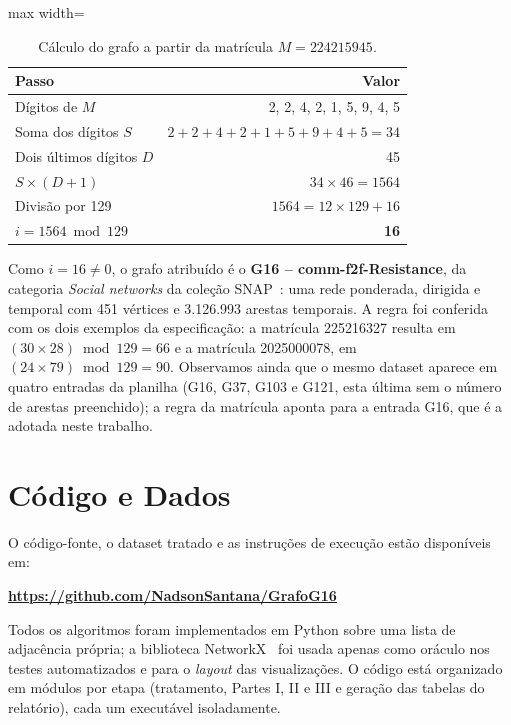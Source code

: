 \documentclass[sigconf]{webmedia}
\begin{document}
\begin{table}[h]
  \caption{Cálculo do grafo a partir da matrícula $M = 224215945$.}
  \label{tab:matricula}
  \begin{adjustbox}{max width=\columnwidth}
  \begin{tabular}{lr}
    \toprule
    Passo & Valor \\
    \midrule
    Dígitos de $M$ & 2, 2, 4, 2, 1, 5, 9, 4, 5 \\
    Soma dos dígitos $S$ & $2+2+4+2+1+5+9+4+5 = 34$ \\
    Dois últimos dígitos $D$ & 45 \\
    $S \times (D + 1)$ & $34 \times 46 = 1564$ \\
    Divisão por 129 & $1564 = 12 \times 129 + 16$ \\
    $i = 1564 \bmod 129$ & \textbf{16} \\
    \bottomrule
  \end{tabular}
  \end{adjustbox}
\end{table}

Como $i = 16 \neq 0$, o grafo atribuído é o \textbf{G16 -- comm-f2f-Resistance}, da categoria \textit{Social networks} da coleção SNAP~\cite{snap}: uma rede ponderada, dirigida e temporal com 451 vértices e 3.126.993 arestas temporais. A regra foi conferida com os dois exemplos da especificação: a matrícula 225216327 resulta em $(30 \times 28) \bmod 129 = 66$ e a matrícula 2025000078, em $(24 \times 79) \bmod 129 = 90$. Observamos ainda que o mesmo dataset aparece em quatro entradas da planilha (G16, G37, G103 e G121, esta última sem o número de arestas preenchido); a regra da matrícula aponta para a entrada G16, que é a adotada neste trabalho.

\section{Código e Dados}
\label{sec:codigo}
O código-fonte, o dataset tratado e as instruções de execução estão disponíveis em:
\begin{center}
  \textbf{\url{https://github.com/NadsonSantana/GrafoG16}}
\end{center}
 Todos os algoritmos foram implementados em Python sobre uma lista de adjacência própria; a biblioteca NetworkX~\cite{networkx} foi usada apenas como oráculo nos testes automatizados e para o \textit{layout} das visualizações. O código está organizado em módulos por etapa (tratamento, Partes I, II e III e geração das tabelas do relatório), cada um executável isoladamente.
\end{document}
